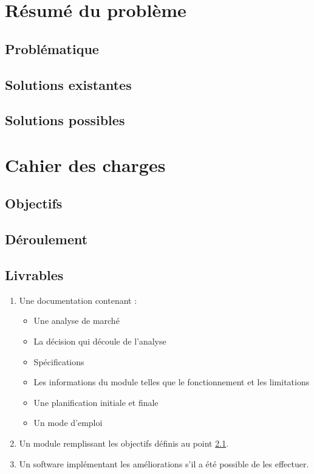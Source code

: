 \documentclass[../report]{subfiles}
\begin{document}
\section{Résumé du problème}
\lipsum[2]
\subsection{Problématique}
\lipsum[1]
\subsection{Solutions existantes}
\lipsum[1]
\subsection{Solutions possibles}
\lipsum[1]
\section{Cahier des charges}
\lipsum[2]
\subsection{Objectifs}\label{subsec:cdc-objectif}
\lipsum[1]
\subsection{Déroulement}
\lipsum[1]
\subsection{Livrables}
\lipsum[1]
\begin{enumerate}
  \item Une documentation contenant :
    \begin{itemize}
      \item Une analyse de marché

      \item La décision qui découle de l’analyse

      \item Spécifications

      \item Les informations du module telles que le fonctionnement et les limitations 

      \item Une planification initiale et finale

      \item Un mode d’emploi
    \end{itemize}
  \item Un module remplissant les objectifs définis au point \ref{subsec:cdc-objectif}.

  \item Un software implémentant les améliorations s’il a été possible de les effectuer.
\end{enumerate}
\end{document}
